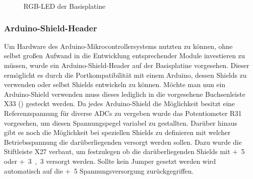 \begin{figure}[H]
    \centering
    \qquad
    \qquad
    \caption[RGB-LED der Basisplatine]{RGB-LED der \gls{Basisplatine}}
    \label{fig:basisplatine-rgbled}
\end{figure}

\subsubsection{Arduino-Shield-Header}
Um Hardware des Arduino-Mikrocontrollersystems nutzten zu können, ohne selbst großen Aufwand in die Entwicklung entsprechender Module investieren zu müssen, wurde ein Arduino-Shield-Header auf der \gls{Basisplatine} vorgesehen. Dieser ermöglicht es durch die Portkompatibilität mit einem Arduino, dessen Shields zu verwenden oder selbst Shields entwickeln zu können. Möchte man nun ein Arduino-Shield verwenden muss dieses lediglich in die vorgesehene Buchsenleiste X33 () gesteckt werden. Da jedes Arduino-Shield die Möglichkeit besitzt eine Referenzspannung für diverse ADCs zu vergeben wurde das Potentiometer R31 vorgesehen, um diesen Spannungspegel variabel zu gestallten. Darüber hinaus gibt es noch die Möglichkeit bei speziellen Shields zu definieren mit welcher Betriebsspannung die darüberliegenden versorgt werden sollen. Dazu wurde die Stiftleiste X27 verbaut, um festzulegen ob die darüberliegenden Shields mit \unit{+5}{\volt} oder \unit{+3,3}{\volt} versorgt werden. Sollte kein Jumper gesetzt werden wird automatisch auf die \unit{+5}{\volt} Spannungsversorgung zurückgegriffen.

